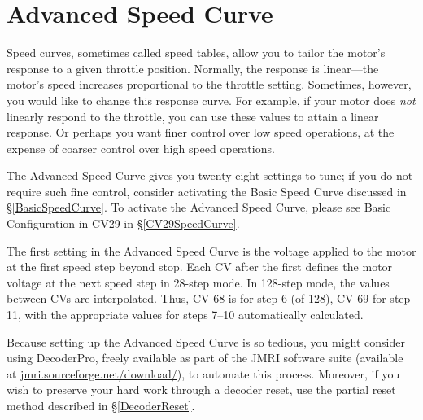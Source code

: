 \documentclass[12pt,letterpaper,draft]{memoir} %
\begin{document}

\section{Advanced Speed Curve}
\label{AdvancedSpeedCurve}

Speed curves, sometimes called speed tables, allow you to tailor the motor's response to a given throttle position. Normally, the response is linear---the motor's speed increases proportional to the throttle setting. Sometimes, however, you would like to change this response curve. For example, if your motor does \textit{not} linearly respond to the throttle, you can use these values to attain a linear response. Or perhaps you want finer control over low speed operations, at the expense of coarser control over high speed operations.

The Advanced Speed Curve gives you twenty-eight settings to tune; if you do not require such fine control, consider activating the Basic Speed Curve discussed in \S\ref{BasicSpeedCurve}. To activate the Advanced Speed Curve, please see Basic Configuration in CV29 in \S\ref{CV29SpeedCurve}.

The first setting in the Advanced Speed Curve is the voltage applied to the motor at the first speed step beyond stop. Each CV after the first defines the motor voltage at the next speed step in 28-step mode. In 128-step mode, the values between CVs are interpolated. Thus, CV 68 is for step 6 (of 128), CV 69 for step 11, with the appropriate values for steps 7--10 automatically calculated.

Because setting up the Advanced Speed Curve is so tedious, you might consider using DecoderPro\textsuperscript{\textregistered}, freely available as part of the JMRI\textsuperscript{\textregistered} software suite (available at \url{jmri.sourceforge.net/download/}), to automate this process. Moreover, if you wish to preserve your hard work through a decoder reset, use the partial reset method described in \S\ref{DecoderReset}.
\end{document}
